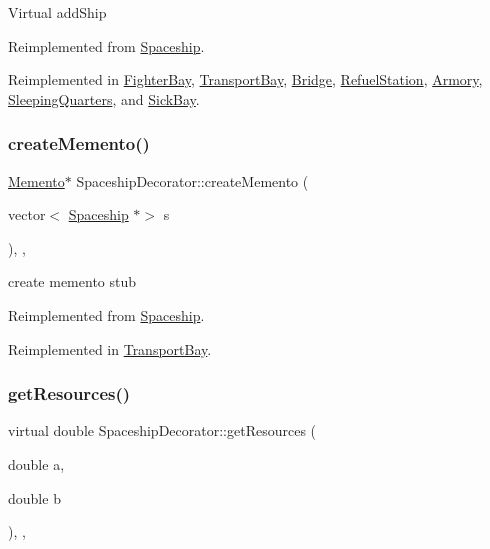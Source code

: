 Virtual add\+Ship 

Reimplemented from \hyperlink{classSpaceship_a90e1321cdbcb459b98b75ab39cef867d}{Spaceship}.



Reimplemented in \hyperlink{classFighterBay_a8975b88b27663c76f82168752593ceda}{Fighter\+Bay}, \hyperlink{classTransportBay_acd6b5b09e81bd28c6dcbe23d561fd99c}{Transport\+Bay}, \hyperlink{classBridge_a49676496d07502909958e747ef4c3214}{Bridge}, \hyperlink{classRefuelStation_a03510ee8365b5095ca80fac0c5a0a780}{Refuel\+Station}, \hyperlink{classArmory_adccb51a0901294546bfb1da350ae6836}{Armory}, \hyperlink{classSleepingQuarters_ae15ba2bf6be5cc0d4580da9ecbbe28f5}{Sleeping\+Quarters}, and \hyperlink{classSickBay_aa70415a7714cdd88553f3694b3f2e9e1}{Sick\+Bay}.

\mbox{\label{classSpaceshipDecorator_a1acde91cd10517c94af41032aa5fdd9e}} 
\subsubsection{\texorpdfstring{create\+Memento()}{createMemento()}}
{\footnotesize\ttfamily \hyperlink{classMemento}{Memento}$\ast$ Spaceship\+Decorator\+::create\+Memento (\begin{DoxyParamCaption}\item[{vector$<$ \hyperlink{classSpaceship}{Spaceship} $\ast$$>$}]{s }\end{DoxyParamCaption})\hspace{0.3cm}{\ttfamily [inline]}, {\ttfamily [protected]}, {\ttfamily [virtual]}}

create memento stub 

Reimplemented from \hyperlink{classSpaceship_a6d272f846b019dec8226ddab65648a7b}{Spaceship}.



Reimplemented in \hyperlink{classTransportBay_aff9390fd8b7434bfa03b408028caf920}{Transport\+Bay}.

\mbox{\label{classSpaceshipDecorator_a5ee7a9a8c146c85f08591e47d971dce7}} 
\subsubsection{\texorpdfstring{get\+Resources()}{getResources()}}
{\footnotesize\ttfamily virtual double Spaceship\+Decorator\+::get\+Resources (\begin{DoxyParamCaption}\item[{double}]{a,  }\item[{double}]{b }\end{DoxyParamCaption})\hspace{0.3cm}{\ttfamily [inline]}, {\ttfamily [protected]}, {\ttfamily [virtual]}}


